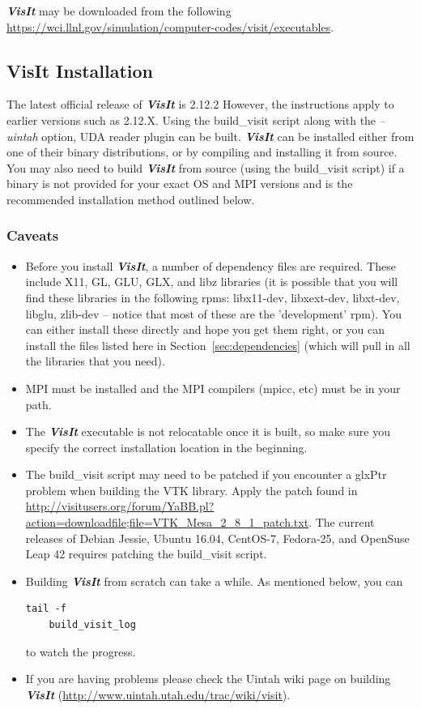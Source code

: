 \documentclass[12pt]{article}
\begin{document}
\textbf{\emph{VisIt}} may be downloaded from the following \url{https://wci.llnl.gov/simulation/computer-codes/visit/executables}.

\subsection{VisIt Installation}

The latest official release of \textbf{\emph{VisIt}} is 2.12.2
However, the instructions apply to earlier versions such as 2.12.X.
Using the build\_visit script along with the \emph{--uintah} option,
UDA reader plugin can be built.  \textbf{\emph{VisIt}} can be
installed either from one of their binary distributions, or by
compiling and installing it from source.  You may also need to build
\textbf{\emph{VisIt}} from source (using the build\_visit script) if a
binary is not provided for your exact OS and MPI versions and is the
recommended installation method outlined below.

\subsubsection{Caveats}
\label{subsec:VisIt_Caveats}
\begin{itemize}
\item Before you install \textbf{\emph{VisIt}}, a number of dependency
  files are required.  These include X11, GL, GLU, GLX, and libz
  libraries (it is possible that you will find these libraries in the
  following rpms: libx11-dev, libxext-dev, libxt-dev, libglu, zlib-dev
  -- notice that most of these are the 'development' rpm).  You can
  either install these directly and hope you get them right, or you
  can install the files listed here in Section~\ref{sec:dependencies}
  (which will pull in all the libraries that you need).
\item MPI must be installed and the MPI compilers (mpicc, etc) must be
  in your path.
\item The \textbf{\emph{VisIt}} executable is not relocatable once it
  is built, so make sure you specify the correct installation location
  in the beginning.
\item The build\_visit script may need to be patched if you encounter
  a glxPtr problem when building the VTK library.  Apply the patch
  found in
  \url{http://visitusers.org/forum/YaBB.pl?action=downloadfile;file=VTK_Mesa_2_8_1_patch.txt}.
  The current releases of Debian Jessie, Ubuntu 16.04, CentOS-7,
  Fedora-25, and OpenSuse Leap 42 requires patching the build\_visit
  script.
\item Building \textbf{\emph{VisIt}} from scratch can take a while.
  As mentioned below, you can \begin{verbatim}tail -f
    build_visit_log\end{verbatim} to watch the progress.
\item If you are having problems please check the Uintah wiki page on
  building \textbf{\emph{VisIt}}
  (\url{http://www.uintah.utah.edu/trac/wiki/visit}).

\end{itemize}
\end{document}
